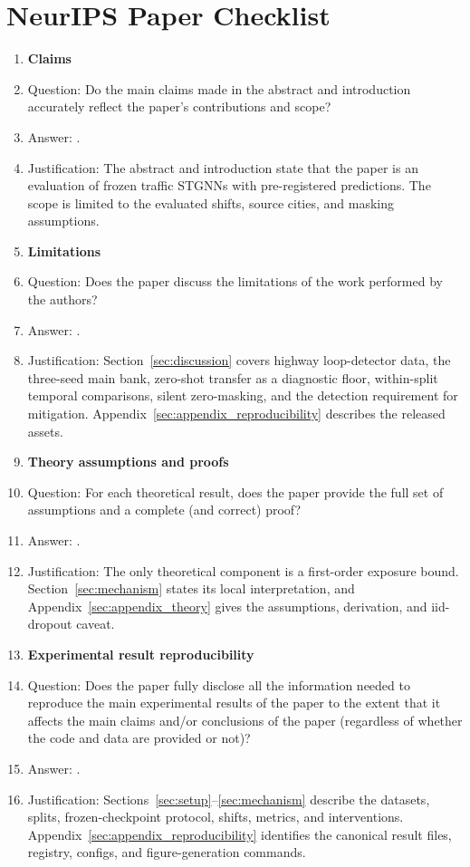 \section*{NeurIPS Paper Checklist}

\begin{enumerate}

\item {\bf Claims}
    \item[] Question: Do the main claims made in the abstract and introduction accurately reflect the paper's contributions and scope?
    \item[] Answer: \answerYes{}.
    \item[] Justification: The abstract and introduction state that the paper is an evaluation of frozen traffic STGNNs with pre-registered predictions. The scope is limited to the evaluated shifts, source cities, and masking assumptions.

\item {\bf Limitations}
    \item[] Question: Does the paper discuss the limitations of the work performed by the authors?
    \item[] Answer: \answerYes{}.
    \item[] Justification: Section~\ref{sec:discussion} covers highway loop-detector data, the three-seed main bank, zero-shot transfer as a diagnostic floor, within-split temporal comparisons, silent zero-masking, and the detection requirement for mitigation. Appendix~\ref{sec:appendix_reproducibility} describes the released assets.

\item {\bf Theory assumptions and proofs}
    \item[] Question: For each theoretical result, does the paper provide the full set of assumptions and a complete (and correct) proof?
    \item[] Answer: \answerYes{}.
    \item[] Justification: The only theoretical component is a first-order exposure bound. Section~\ref{sec:mechanism} states its local interpretation, and Appendix~\ref{sec:appendix_theory} gives the assumptions, derivation, and iid-dropout caveat.

\item {\bf Experimental result reproducibility}
    \item[] Question: Does the paper fully disclose all the information needed to reproduce the main experimental results of the paper to the extent that it affects the main claims and/or conclusions of the paper (regardless of whether the code and data are provided or not)?
    \item[] Answer: \answerYes{}.
    \item[] Justification: Sections~\ref{sec:setup}--\ref{sec:mechanism} describe the datasets, splits, frozen-checkpoint protocol, shifts, metrics, and interventions. Appendix~\ref{sec:appendix_reproducibility} identifies the canonical result files, registry, configs, and figure-generation commands.


\end{enumerate}
